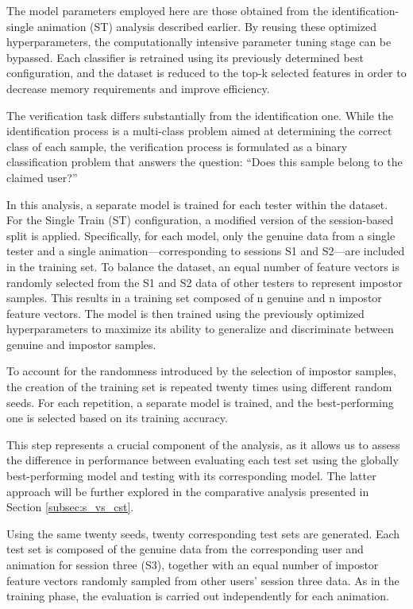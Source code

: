 \documentclass[12pt]{report}
\begin{document}
The model parameters employed here are those obtained from the identification-single animation (ST) analysis described earlier.
By reusing these optimized hyperparameters, the computationally intensive parameter tuning stage can be bypassed.
Each classifier is retrained using its previously determined best configuration, and the dataset is reduced to the top-k selected features in order to decrease memory requirements and improve efficiency.

The verification task differs substantially from the identification one.
While the identification process is a multi-class problem aimed at determining the correct class of each sample, the verification process is formulated as a binary classification problem that answers the question: “Does this sample belong to the claimed user?”

In this analysis, a separate model is trained for each tester within the dataset.
For the Single Train (ST) configuration, a modified version of the session-based split is applied.
Specifically, for each model, only the genuine data from a single tester and a single animation—corresponding to sessions S1 and S2—are included in the training set.
To balance the dataset, an equal number of feature vectors is randomly selected from the S1 and S2 data of other testers to represent impostor samples.
This results in a training set composed of n genuine and n impostor feature vectors.
The model is then trained using the previously optimized hyperparameters to maximize its ability to generalize and discriminate between genuine and impostor samples.

To account for the randomness introduced by the selection of impostor samples, the creation of the training set is repeated twenty times using different random seeds.
For each repetition, a separate model is trained, and the best-performing one is selected based on its training accuracy.

This step represents a crucial component of the analysis, as it allows us to assess the difference in performance between evaluating each test set using the globally best-performing model and testing with its corresponding model.
The latter approach will be further explored in the comparative analysis presented in Section \ref{subsec:s_vs_cst}.

Using the same twenty seeds, twenty corresponding test sets are generated.
Each test set is composed of the genuine data from the corresponding user and animation for session three (S3), together with an equal number of impostor feature vectors randomly sampled from other users’ session three data.
As in the training phase, the evaluation is carried out independently for each animation.
\end{document}
